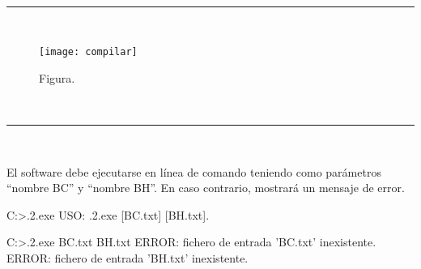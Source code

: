 
\begin{center}
	{\fboxrule=4pt } \\
	\setcounter{chapter}{1}
	\setcounter{section}{0}
	\rule{15cm}{0pt} \\
\end{center}
\begin{figure}[H]
	\texttt{[image: compilar]}
	\centering
	\caption{Figura.}
    \label{fig:SBR}
\end{figure}
\begin{center}
	{\fboxrule=4pt } \\
	\setcounter{chapter}{2}
	\setcounter{section}{0}
	\rule{15cm}{0pt} \\
\end{center}
\par  El  software  debe  ejecutarse  en  línea  de  comando  teniendo  como 
parámetros ``nombre  BC'' y ``nombre  BH''. En caso contrario, mostrará un mensaje de error.

\begin{listing}[style=consola]
C:\Users\ElenaPerez\SBR\bin\Debug>.\practica2.exe
USO: .\practica2.exe [BC.txt] [BH.txt].  
\end{listing}
\begin{listing}[style=consola]
C:\Users\ElenaPerez\SBR\bin\Debug>.\practica2.exe BC.txt BH.txt
ERROR: fichero de entrada 'BC.txt' inexistente.
ERROR: fichero de entrada 'BH.txt' inexistente.
\end{listing}


